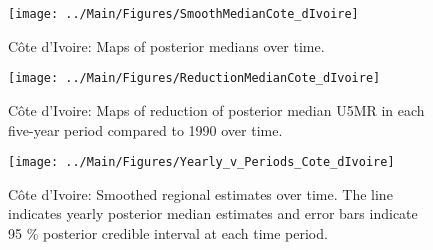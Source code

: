 \documentclass[12pt]{article}\usepackage[]{graphicx}\usepackage[]{color}
\newenvironment{knitrout}{}{} %
\begin{document}
\begin{knitrout}
\color{fgcolor}\begin{figure}[bht]

{\centering \texttt{[image: ../Main/Figures/SmoothMedianCote\_dIvoire]} 

}

\caption[C\^{o}te d'Ivoire]{C\^{o}te d'Ivoire: Maps of posterior medians over time.}\label{fig:unnamed-chunk-84}
\end{figure}


\end{knitrout}
\begin{knitrout}
\color{fgcolor}\begin{figure}[bht]

{\centering \texttt{[image: ../Main/Figures/ReductionMedianCote\_dIvoire]} 

}

\caption[C\^{o}te d'Ivoire]{C\^{o}te d'Ivoire: Maps of reduction of posterior median U5MR in each five-year period compared to 1990 over time.}\label{fig:unnamed-chunk-85}
\end{figure}


\end{knitrout}
\begin{knitrout}
\color{fgcolor}\begin{figure}[bht]

{\centering \texttt{[image: ../Main/Figures/Yearly\_v\_Periods\_Cote\_dIvoire]} 

}

\caption[C\^{o}te d'Ivoire]{C\^{o}te d'Ivoire: Smoothed regional estimates over time. The line indicates yearly posterior median estimates and error bars indicate 95 \% posterior credible interval at each time period.}\label{fig:unnamed-chunk-86}
\end{figure}


\end{knitrout}
\end{document}
